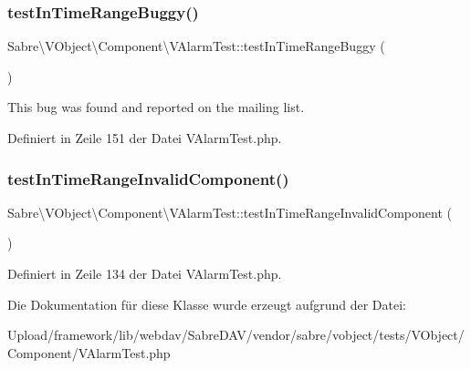 \subsubsection{\texorpdfstring{test\+In\+Time\+Range\+Buggy()}{testInTimeRangeBuggy()}}
{\footnotesize\ttfamily Sabre\textbackslash{}\+V\+Object\textbackslash{}\+Component\textbackslash{}\+V\+Alarm\+Test\+::test\+In\+Time\+Range\+Buggy (\begin{DoxyParamCaption}{ }\end{DoxyParamCaption})}

This bug was found and reported on the mailing list. 

Definiert in Zeile 151 der Datei V\+Alarm\+Test.\+php.

\mbox{\label{class_sabre_1_1_v_object_1_1_component_1_1_v_alarm_test_aab31fde5e80d391187537a98ca5e3ec0}} 
\subsubsection{\texorpdfstring{test\+In\+Time\+Range\+Invalid\+Component()}{testInTimeRangeInvalidComponent()}}
{\footnotesize\ttfamily Sabre\textbackslash{}\+V\+Object\textbackslash{}\+Component\textbackslash{}\+V\+Alarm\+Test\+::test\+In\+Time\+Range\+Invalid\+Component (\begin{DoxyParamCaption}{ }\end{DoxyParamCaption})}



Definiert in Zeile 134 der Datei V\+Alarm\+Test.\+php.



Die Dokumentation für diese Klasse wurde erzeugt aufgrund der Datei\+:\begin{DoxyCompactItemize}
\item 
Upload/framework/lib/webdav/\+Sabre\+D\+A\+V/vendor/sabre/vobject/tests/\+V\+Object/\+Component/V\+Alarm\+Test.\+php\end{DoxyCompactItemize}
